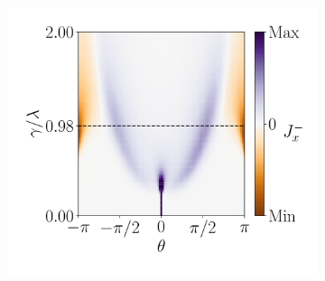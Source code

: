 \begin{figure}[h!]
\begin{minipage}[h!]{1\textwidth}
\begin{subfigure}[b!]{0.35 \textwidth}
             \label{}
         \end{subfigure}\hspace*{-0.5em}
         \begin{subfigure}[b!]{0.35 \textwidth}
             \caption{}
             \includegraphics[width=\textwidth]{Imagenes/Resultados_pump_Cuadrado/y/current_square_pump_negy.pdf}
             \label{}
         \end{subfigure}\hspace*{-0.5em}
     \end{minipage}\vspace*{-1em}
     

\end{figure}
